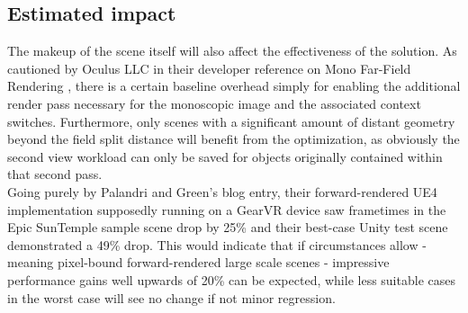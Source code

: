 \subsection{Estimated impact}
The makeup of the scene itself will also affect the effectiveness of the solution. As cautioned by Oculus LLC in their developer reference on Mono Far-Field Rendering \cite{Palandri.2016}, there is a certain baseline overhead simply for enabling the additional render pass necessary for the monoscopic image and the associated context switches. Furthermore, only scenes with a significant amount of distant geometry beyond the field split distance will benefit from the optimization, as obviously the second view workload can only be saved for objects originally contained within that second pass. \\
Going purely by Palandri and Green's blog entry, their forward-rendered UE4 implementation supposedly running on a GearVR device saw frametimes in the Epic SunTemple sample scene drop by 25\% and their best-case Unity test scene demonstrated a 49\% drop\cite{Palandri.2016}. 
This would indicate that if circumstances allow - meaning pixel-bound forward-rendered large scale scenes - impressive performance gains well upwards of 20\% can be expected, while less suitable cases in the worst case will see no change if not minor regression. 

